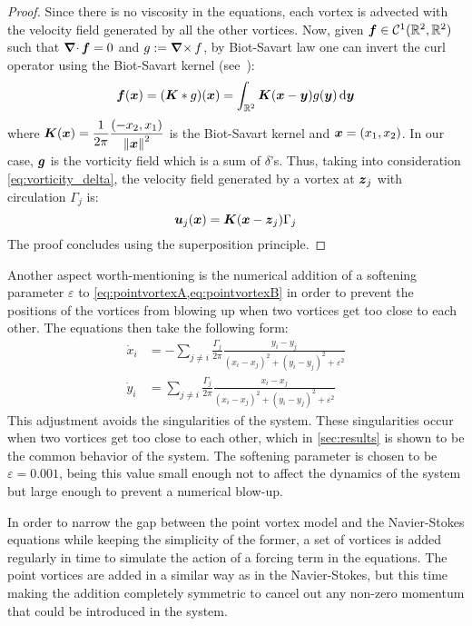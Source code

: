 \documentclass[../main.tex]{subfiles}
\begin{document}
\begin{proof}
	Since there is no viscosity in the equations, each vortex is advected with the velocity field generated by all the other vortices. Now, given $\boldsymbol{f}\in \mathcal{C}^1(\mathbb{R}^2,\mathbb{R}^2)$ such that $\operatorname{\boldsymbol{\nabla}\cdot} \boldsymbol{f} = 0$ and $g:=\operatorname{\boldsymbol{\nabla}\times} f$, by Biot-Savart law one can invert the curl operator using the Biot-Savart kernel (see~\cite{Griffiths}):
	\begin{equation}\label{eq:biotsavart}
		\boldsymbol{f}(\boldsymbol{x}) = (\boldsymbol{K} * g)(\boldsymbol{x}) = \int_{\mathbb{R}^2} \boldsymbol{K}(\boldsymbol{x}-\boldsymbol{y}) g(\boldsymbol{y}) \dd{\boldsymbol{y}}
	\end{equation}
	where $\displaystyle\boldsymbol{K}(\boldsymbol{x}) = \frac{1}{2\pi} \frac{(-x_2,x_1)}{{\left\|\boldsymbol{x}\right\|^2}}$ is the Biot-Savart kernel and $\boldsymbol{x}=(x_1,x_2)$. In our case, $\boldsymbol{g}$ is the vorticity field which is a sum of $\delta$'s. Thus, taking into consideration \cref{eq:vorticity_delta}, the velocity field generated by a vortex at $\boldsymbol{z}_j$ with circulation $\Gamma_j$ is:
	\begin{equation}
		\boldsymbol{u}_j(\boldsymbol{x}) = \boldsymbol{K}(\boldsymbol{x}-\boldsymbol{z}_j) \Gamma_j
	\end{equation}
	The proof concludes using the superposition principle.
\end{proof}
Another aspect worth-mentioning is the numerical addition of a softening parameter $\varepsilon$ to \cref{eq:pointvortexA,eq:pointvortexB} in order to prevent the positions of the vortices from blowing up when two vortices get too close to each other. The equations then take the following form:
\begin{align}\label{eq:pointvortexA_soft}
	\dot{x}_i & = -\sum_{j\neq i} \frac{\Gamma_j}{2\pi} \frac{y_i-y_j}{{(x_i-x_j)}^2+{(y_i-y_j)}^2+\varepsilon^2} \\
	\label{eq:pointvortexB_soft}
	\dot{y}_i & = \sum_{j\neq i} \frac{\Gamma_j}{2\pi} \frac{x_i-x_j}{{(x_i-x_j)}^2+{(y_i-y_j)}^2+\varepsilon^2}
\end{align}
This adjustment avoids the singularities of the system. These singularities occur when two vortices get too close to each other, which in \cref{sec:results} is shown to be the common behavior of the system. The softening parameter is chosen to be $\varepsilon=0.001$, being this value small enough not to affect the dynamics of the system but large enough to prevent a numerical blow-up.

In order to narrow the gap between the point vortex model and the Navier-Stokes equations while keeping the simplicity of the former, a set of vortices is added regularly in time to simulate the action of a forcing term in the equations. The point vortices are added in a similar way as in the Navier-Stokes, but this time making the addition completely symmetric to cancel out any non-zero momentum that could be introduced in the system.
\end{document}
